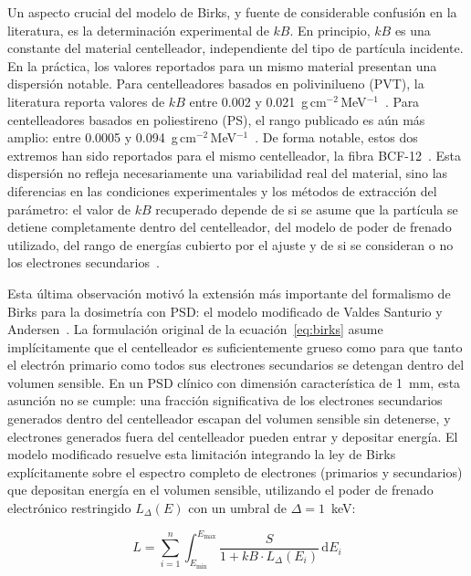 \documentclass[11pt,a4paper]{article}
\begin{document}
Un aspecto crucial del modelo de Birks, y fuente de considerable confusión en la literatura, es la determinación experimental de $kB$. En principio, $kB$ es una constante del material centelleador, independiente del tipo de partícula incidente. En la práctica, los valores reportados para un mismo material presentan una dispersión notable. Para centelleadores basados en polivinilueno (PVT), la literatura reporta valores de $kB$ entre 0.002 y 0.021~g\,cm$^{-2}$\,MeV$^{-1}$~\cite{boivin2016}. Para centelleadores basados en poliestireno (PS), el rango publicado es aún más amplio: entre 0.0005 y 0.094~g\,cm$^{-2}$\,MeV$^{-1}$~\cite{boivin2016}. De forma notable, estos dos extremos han sido reportados para el mismo centelleador, la fibra BCF-12~\cite{boivin2016}. Esta dispersión no refleja necesariamente una variabilidad real del material, sino las diferencias en las condiciones experimentales y los métodos de extracción del parámetro: el valor de $kB$ recuperado depende de si se asume que la partícula se detiene completamente dentro del centelleador, del modelo de poder de frenado utilizado, del rango de energías cubierto por el ajuste y de si se consideran o no los electrones secundarios~\cite{santurio2020}.

Esta última observación motivó la extensión más importante del formalismo de Birks para la dosimetría con PSD: el modelo modificado de Valdes Santurio y Andersen~\cite{santurio2020}. La formulación original de la ecuación~\eqref{eq:birks} asume implícitamente que el centelleador es suficientemente grueso como para que tanto el electrón primario como todos sus electrones secundarios se detengan dentro del volumen sensible. En un PSD clínico con dimensión característica de 1~mm, esta asunción no se cumple: una fracción significativa de los electrones secundarios generados dentro del centelleador escapan del volumen sensible sin detenerse, y electrones generados fuera del centelleador pueden entrar y depositar energía. El modelo modificado resuelve esta limitación integrando la ley de Birks explícitamente sobre el espectro completo de electrones (primarios y secundarios) que depositan energía en el volumen sensible, utilizando el poder de frenado electrónico restringido $L_{\Delta}(E)$ con un umbral de $\Delta = 1$~keV:

\begin{equation}
L = \sum_{i=1}^{n} \int_{E_{\min}}^{E_{\max}} \frac{S}{1 + kB \cdot L_{\Delta}(E_i)} \,\mathrm{d}E_i
\label{eq:birks_modified}
\end{equation}
\end{document}
